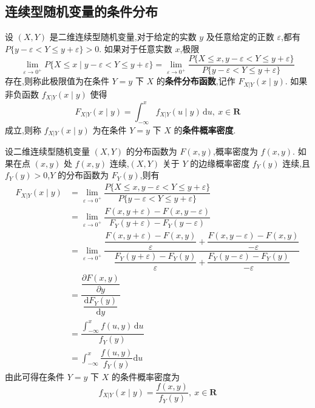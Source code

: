 \subsection{连续型随机变量的条件分布}

\begin{definition}
    设 $(X,Y)$ 是二维连续型随机变量,对于给定的实数 $y$ 及任意给定的正数 $\varepsilon$,都有 $P\{y-\varepsilon < Y \leqslant y+\varepsilon\} > 0$. 如果对于任意实数 $x$,极限
    $$
    \lim_{\varepsilon \to 0^+} P\{X \leqslant x \mid y-\varepsilon < Y \leqslant y+\varepsilon\} = \lim_{\varepsilon \to 0^+} \dfrac{P\{X \leqslant x, y-\varepsilon < Y \leqslant y+\varepsilon\}}{P\{y-\varepsilon < Y \leqslant y+\varepsilon\}}
    $$
    存在,则称此极限值为在条件 $Y=y$ 下 $X$ 的\textbf{条件分布函数},记作 $F_{X|Y}(x \mid y)$. 如果非负函数 $f_{X|Y}(x \mid y)$ 使得
    $$
    F_{X|Y}(x \mid y) = \int_{-\infty}^x f_{X|Y}(u \mid y) \, \text{d}u,\ x \in \mathbf{R}
    $$
    成立,则称 $f_{X|Y}(x \mid y)$ 为在条件 $Y=y$ 下 $X$ 的\textbf{条件概率密度}.
\end{definition}

设二维连续型随机变量 $(X,Y)$ 的分布函数为 $F(x,y)$,概率密度为 $f(x,y)$. 如果在点 $(x,y)$ 处 $f(x,y)$ 连续,$(X,Y)$ 关于 $Y$ 的边缘概率密度 $f_{Y}(y)$ 连续,且 $f_{Y}(y)>0$,$Y$ 的分布函数为 $F_{Y}(y)$,则有
$$
\begin{aligned}
    F_{X|Y}(x \mid y) &= \lim_{\varepsilon \to 0^+} \dfrac{P\{X \leqslant x, y-\varepsilon < Y \leqslant y+\varepsilon\}}{P\{y-\varepsilon < Y \leqslant y+\varepsilon\}} \\[0.7em]
    &= \lim_{\varepsilon \to 0^+} \dfrac{F(x, y+\varepsilon) - F(x, y-\varepsilon)}{F_{Y}(y+\varepsilon) - F_{Y}(y-\varepsilon)} \\[0.7em]
    &= \lim_{\varepsilon \to 0^+} \dfrac{\dfrac{F(x, y+\varepsilon) - F(x,y)}{\varepsilon} + \dfrac{F(x, y-\varepsilon) - F(x,y)}{-\varepsilon}}{\dfrac{F_{Y}(y+\varepsilon) - F_{Y}(y)}{\varepsilon} + \dfrac{F_{Y}(y-\varepsilon) - F_{Y}(y)}{-\varepsilon}} \\
    &= \dfrac{\dfrac{\partial F(x,y)}{\partial y}}{\dfrac{\text{d} F_{Y}(y)}{\text{d}y}} \\[1em]
    &= \dfrac{\displaystyle\int_{-\infty}^x f(u,y) \, \text{d}u}{f_{Y}(y)} \\[1em]
    &= \int_{-\infty}^x \dfrac{f(u,y)}{f_{Y}(y)} \text{d}u
\end{aligned}
$$
由此可得在条件 $Y=y$ 下 $X$ 的条件概率密度为
$$
f_{X|Y}(x \mid y) = \dfrac{f(x,y)}{f_{Y}(y)},\ x \in \mathbf{R}
$$

